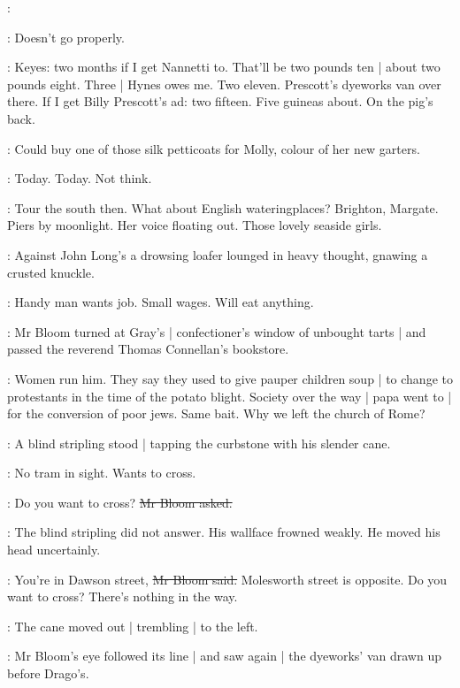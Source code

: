 \BloomInt:

\BloomInt:
Doesn't go properly.

\BloomInt:
Keyes: two months if I get Nannetti to.
That'll be two pounds ten |
about two pounds eight.
Three |
Hynes owes me.
Two eleven.
Prescott's dyeworks van over there.
If I get Billy Prescott's ad:
two fifteen.
Five guineas about.
On the pig's back.

\BloomInt:
Could buy one of those silk petticoats for Molly,
colour of her new garters.

\BloomInt:
Today.
Today.
Not think.

\BloomInt:
Tour the south then.
What about English wateringplaces?
Brighton, Margate.
Piers by moonlight.
Her voice floating out.
Those lovely seaside girls.

:
Against John Long's
a drowsing loafer lounged in heavy thought,
gnawing a crusted knuckle.

\BloomInt:
Handy man wants job.
Small wages.
Will eat anything.

:
Mr Bloom turned at Gray's |
confectioner's window of unbought tarts |
and passed the reverend Thomas Connellan's bookstore.

\BloomInt:
Women run him.
They say they used to give pauper children soup |
to change to protestants in the time of the potato blight.
Society over the way |
papa went to |
for the conversion of poor jews.
Same bait.
Why we left the church of Rome?

:
A blind stripling stood |
tapping the curbstone with his slender cane.

\BloomInt:
No tram in sight.
Wants to cross.

\Bloom:
Do you want to cross?
\sout{Mr Bloom asked.}

:
The blind stripling did not answer.
His wallface frowned weakly.
He moved his head uncertainly.

\Bloom:
You're in Dawson street,
\sout{Mr Bloom said.}
Molesworth street is opposite.
Do you want to cross?
There's nothing in the way.

:
The cane moved out |
trembling |
to the left.

:
Mr Bloom's eye followed its line |
and saw again |
the dyeworks' van drawn up before Drago's.

